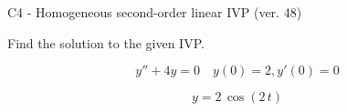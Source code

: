 \begin{exercise}
  \begin{exerciseTitle}C4 - Homogeneous second-order linear IVP (ver. 48)\end{exerciseTitle}
  \begin{exerciseStatement}
    
Find the solution to the given IVP.

    
\[y''+4y = 0 \hspace{1em} y(0) = 2 , y'(0) = 0\]

  \end{exerciseStatement}
  \begin{exerciseAnswer}
    
\[y= 2 \, \cos\left(2 \, t\right)\]

  \end{exerciseAnswer}
\end{exercise}